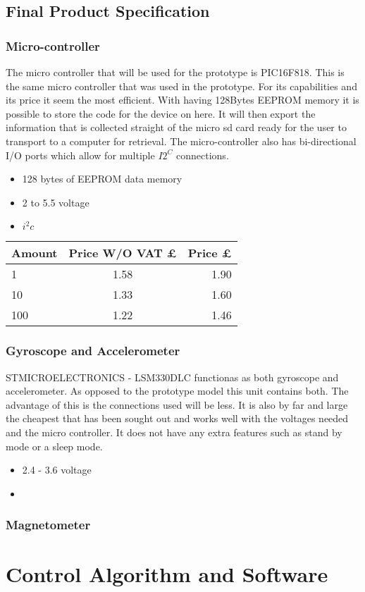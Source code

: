 \documentclass{report}
\begin{document}
\section{Final Product Specification}

\subsection{Micro-controller}
The micro controller that will be used for the prototype is PIC16F818. This is the same micro controller that was used in the prototype. For its capabilities and its price it seem the most efficient. With having 128Bytes EEPROM memory it is possible to store the code for the device on here. It will then export the information that is collected straight of the micro sd card ready for the user to transport to a computer for retrieval. The micro-controller also has bi-directional I/O ports which allow for multiple $I2^C$ connections.
\begin{itemize}
\item 128 bytes of EEPROM data memory
\item 2 to 5.5 voltage
\item $i^2c$
\end{itemize}
\begin{center}
  \begin{tabular}{ |l | c | r |}
    \hline
    Amount & Price W/O VAT £ & Price £ \\ \hline
    1 & 1.58 & 1.90 \\ \hline
    10 & 1.33 & 1.60 \\ \hline
    100 & 1.22 & 1.46   \\ \hline
  \end{tabular}
\end{center}

\subsection{Gyroscope and Accelerometer}
STMICROELECTRONICS - LSM330DLC functionas as both gyroscope and accelerometer. As opposed to the prototype model this unit contains both. The advantage of this is the connections used will be less. It is also by far and large the cheapest that has been sought out and works well with the voltages needed and the micro controller. It does not have any extra features such as stand by mode or a sleep mode.
\begin{itemize}
\item 2.4 - 3.6 voltage 
\item 
\end{itemize}




\subsection{Magnetometer}




\chapter{Control Algorithm and Software}


 
\end{document}
